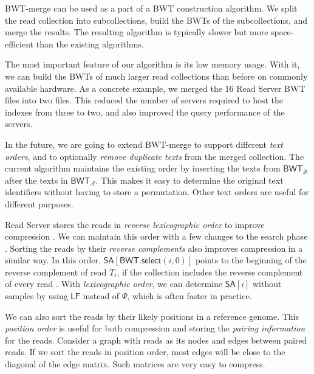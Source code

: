 \documentclass[smallabstract,smallcaptions]{dccpaper}
\newcommand{\BWT}{\textsf{BWT}}
\newcommand{\mSA}{\ensuremath{\mathsf{SA}}}
\newcommand{\mBWT}{\ensuremath{\mathsf{BWT}}}
\newcommand{\mLF}{\ensuremath{\mathsf{LF}}}
\newcommand{\mselect}{\ensuremath{\mathsf{select}}}
\newcommand{\Acoll}{\ensuremath{\mathcal{A}}}
\newcommand{\Bcoll}{\ensuremath{\mathcal{B}}}
\newcommand{\BWTmerge}{\textsf{BWT\nobreakdash-merge}}
\begin{document}
\BWTmerge{} can be used as a part of a \BWT{} construction algorithm. We split the read collection into subcollections, build the \BWT{}s of the subcollections, and merge the results. The resulting algorithm is typically slower but more space-efficient than the existing algorithms.

The most important feature of our algorithm is its low memory usage. With it, we can build the \BWT{}s of much larger read collections than before on commonly available hardware. As a concrete example, we merged the 16 Read Server \BWT{} files into two files. This reduced the number of servers required to host the indexes from three to two, and also improved the query performance of the servers.

In the future, we are going to extend \BWTmerge{} to support different \emph{text orders}, and to optionally \emph{remove duplicate texts} from the merged collection. The current algorithm maintains the existing order by inserting the texts from $\mBWT_{\Bcoll}$ after the texts in $\mBWT_{\Acoll}$. This makes it easy to determine the original text identifiers without having to store a permutation. Other text orders are useful for different purposes.

Read Server stores the reads in \emph{reverse lexicographic order} to improve compression \cite{Cox2012}. We can maintain this order with a few changes to the search phase \cite{Li2014a}. Sorting the reads by their \emph{reverse complements} also improves compression in a similar way. In this order, $\mSA[\mBWT.\mselect(i,0)]$ points to the beginning of the reverse complement of read $T_{i}$, if the collection includes the reverse complement of every read \cite{Li2014a}. With \emph{lexicographic order}, we can determine $\mSA[i]$ without samples by using $\mLF$ instead of $\Psi$, which is often faster in practice.

We can also sort the reads by their likely positions in a reference genome. This \emph{position order} is useful for both compression and storing the \emph{pairing information} for the reads. Consider a graph with reads as its nodes and edges between paired reads. If we sort the reads in position order, most edges will be close to the diagonal of the edge matrix. Such matrices are very easy to compress.

\newpage
{}


\end{document}

